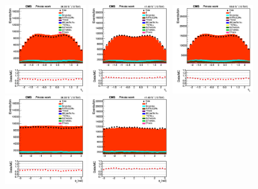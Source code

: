 \documentclass{cernatlasnote}
\begin{document}
\begin{figure}[htp]
\centering
 \includegraphics[width=0.32\textwidth]{images/emu_channel/2016/16_Range_0pt7_1pt3/Dilepton_eta_filter_M20_MET40_Linear.png}
\includegraphics[width=0.32\textwidth]{images/emu_channel/2017/17_Range_0pt7_1pt3/Dilepton_eta_filter_M20_MET40_Linear.png}
 \includegraphics[width=0.32\textwidth]{images/emu_channel/2018/18_Range_0pt7_1pt3/Dilepton_eta_filter_M20_MET40_Linear.png}\\
 \includegraphics[width=0.32\textwidth]{images/emu_channel/2016/16_Range_0pt7_1pt3/Dilepton_phi_filter_M20_MET40_Linear.png}
\includegraphics[width=0.32\textwidth]{images/emu_channel/2017/17_Range_0pt7_1pt3/Dilepton_phi_filter_M20_MET40_Linear.png}

\end{figure}
\end{document}
